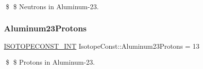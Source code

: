 \$ \$ Neutrons in Aluminum-\/23. \mbox{\label{group___isotope_const-_aluminum-_al23_ga45df744f167464a340216bcf6d2b5d54}} 
\subsubsection{\texorpdfstring{Aluminum23\+Protons}{Aluminum23Protons}}
{\footnotesize\ttfamily \mbox{\hyperlink{group___isotope_const-_macros_ga5f18360b3e99483a35c32d789e62621c}{I\+S\+O\+T\+O\+P\+E\+C\+O\+N\+S\+T\+\_\+\+I\+NT}} Isotope\+Const\+::\+Aluminum23\+Protons = 13}

\$ \$ Protons in Aluminum-\/23. 